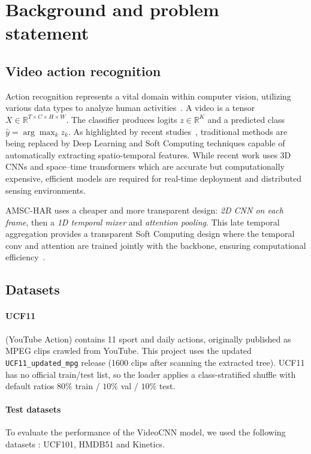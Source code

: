 \documentclass[11pt,a4paper]{article}
\begin{document}
\section{Background and problem statement}
\label{sec:bg}

\subsection{Video action recognition}

Action recognition represents a vital domain within computer vision, utilizing various data types to analyze human activities~\cite{houssein2025integrating}. A video is a tensor $X\in\mathbb{R}^{T\times C\times H\times W}$. The classifier produces logits $z\in\mathbb{R}^{K}$ and a predicted class $\hat{y}=\arg\max_k z_k$. As highlighted by recent studies~\cite{houssein2025integrating}, traditional methods are being replaced by Deep Learning and Soft Computing techniques capable of automatically extracting spatio-temporal features. While recent work uses 3D CNNs and space--time transformers which are accurate but computationally expensive, efficient models are required for real-time deployment and distributed sensing environments.

AMSC-HAR uses a cheaper and more transparent design:
\emph{2D CNN on each frame}, then a \emph{1D temporal mixer} and
\emph{attention pooling}.
This late temporal aggregation provides a transparent Soft Computing design where the temporal conv and attention are trained jointly with the backbone, ensuring computational efficiency~\cite{houssein2025integrating}.

\subsection{Datasets}

\paragraph{UCF11} (YouTube Action) contains 11 sport and
daily actions, originally published as MPEG clips crawled from YouTube.
This project uses the updated \texttt{UCF11\_updated\_mpg} release
(1600 clips after scanning the extracted tree).
UCF11 has no official train/test list, so the loader applies a
class-stratified shuffle with default ratios
$80\%$ train / $10\%$ val / $10\%$ test.

\paragraph{Test datasets} To evaluate the performance of the VideoCNN model, we used the following datasets : UCF101, HMDB51 and Kinetics.
\end{document}
